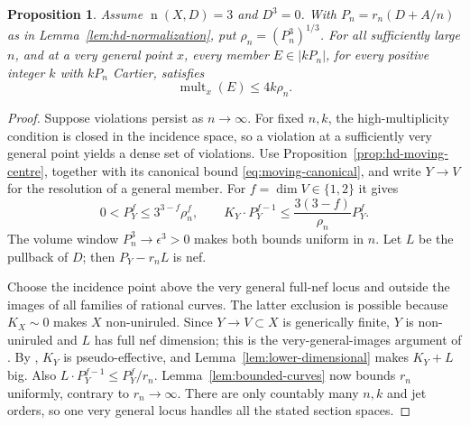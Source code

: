 \documentclass[12pt,a4paper,psamsfonts]{amsart}
\theoremstyle{definition}
\theoremstyle{plain}
\newtheorem{proposition}[lemma]{Proposition}
\newcommand{\mult}{\operatorname{mult}}
\newcommand{\nef}{\operatorname{n}}
\begin{document}
\begin{proposition}\label{prop:scalar-bound}
Assume $\nef(X,D)=3$ and $D^3=0$. With
$P_n=r_n(D+A/n)$ as in Lemma~\ref{lem:hd-normalization}, put
$\rho_n=(P_n^3)^{1/3}$. For all sufficiently large $n$, and at a very general point $x$, every
member $E\in|kP_n|$, for every positive integer $k$ with $kP_n$
Cartier, satisfies
\[
 \mult_x(E)\le4k\rho_n.
\]
\end{proposition}
\begin{proof}
Suppose violations persist as $n\to\infty$. For fixed $n,k$, the
high-multiplicity condition is closed in the incidence space, so
a violation at a sufficiently very general point yields a
dense set of violations. Use
Proposition~\ref{prop:hd-moving-centre}, together with its canonical
bound \eqref{eq:moving-canonical}, and write $Y\to V$ for the
resolution of a general member. For $f=\dim V\in\{1,2\}$ it gives
\[
 0<P_Y^f\le3^{3-f}\rho_n^f,\qquad
 K_Y\cdot P_Y^{f-1}\le\frac{3(3-f)}{\rho_n}P_Y^f.
\]
The volume window $P_n^3\to\epsilon^3>0$ makes both bounds
uniform in $n$. Let $L$ be the pullback of $D$; then
$P_Y-r_nL$ is nef.

Choose the incidence point above the very general full-nef locus
and outside the images of all families of rational curves.
The latter exclusion is possible because $K_X\sim0$ makes $X$
non-uniruled. Since $Y\to V\subset X$ is generically finite,
$Y$ is non-uniruled and $L$ has full nef dimension; this is
the very-general-images argument of \cite[Lemma~4.2]{NS}.
By \cite{BDPP}, $K_Y$ is pseudo-effective, and
Lemma~\ref{lem:lower-dimensional} makes $K_Y+L$ big.
Also $L\cdot P_Y^{f-1}\le P_Y^f/r_n$.
Lemma~\ref{lem:bounded-curves} now bounds $r_n$ uniformly,
contrary to $r_n\to\infty$.
There are only countably many $n,k$ and jet orders, so one
very general locus handles all the stated section spaces.
\end{proof}
\end{document}
